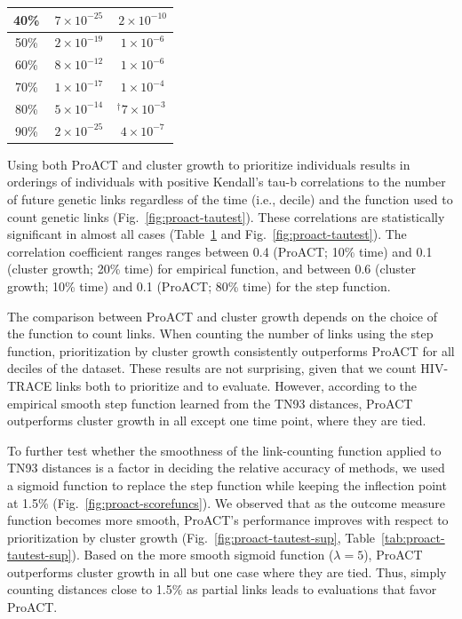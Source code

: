 \begin{table}[!ht]
\begin{center}
\begin{tabular}{|c|c|c|}
\hline
40\% & $^{\ }7\times10^{-25}$ & $^{\ }2\times10^{-10}$\\
\hline
50\% & $^{\ }2\times10^{-19}$ & $^{\ }1\times10^{-6}$\\
\hline
60\% & $^{\ }8\times10^{-12}$ & $^{\ }1\times10^{-6}$\\
\hline
70\% & $^{\ }1\times10^{-17}$ & $^{\ }1\times10^{-4}$\\
\hline
80\% & $^{\ }5\times10^{-14}$ & $^\dag7\times10^{-3}$\\
\hline
90\% & $^{\ }2\times10^{-25}$ & $^{\ }4\times10^{-7}$\\
\hline
\end{tabular}
\end{center}
\label{tab:proact-tautest}
\end{table}

Using both ProACT and cluster growth to prioritize individuals results in orderings of individuals with positive Kendall's tau-b correlations to the number of future genetic links  regardless of the time (i.e., decile) and the function used to count genetic links (Fig.~\ref{fig:proact-tautest}). These correlations are statistically significant in almost all cases  (Table~\ref{tab:proact-tautest} and Fig.~\ref{fig:proact-tautest}). The correlation coefficient ranges ranges between 0.4 (ProACT; 10\% time) and 0.1 (cluster growth; 20\% time) for empirical function, and between 0.6 (cluster growth; 10\% time) and 0.1 (ProACT; 80\% time) for the step function.

The comparison between ProACT and cluster growth depends on the choice of the function to count links. When counting the number of links using the step function, prioritization by cluster growth consistently outperforms ProACT for all deciles of the dataset. These results are not surprising, given that we count HIV-TRACE links both to prioritize and to evaluate. However, according to the empirical smooth step function learned from the \gls{TN93} distances, ProACT outperforms cluster growth in all except one time point, where they are tied.

To further test whether the smoothness of the link-counting function applied to \gls{TN93} distances is a factor in deciding the relative accuracy of methods, we used a sigmoid function to replace the step function while keeping the inflection point at 1.5\% (Fig.~\ref{fig:proact-scorefuncs}). We observed that as the outcome measure function becomes more smooth, ProACT's performance improves with respect to prioritization by cluster growth (Fig.~\ref{fig:proact-tautest-sup}, Table~\ref{tab:proact-tautest-sup}). Based on the more smooth sigmoid function ($\lambda=5$), ProACT outperforms cluster growth in all but one case where they are tied. Thus, simply counting distances close to 1.5\% as partial links leads to evaluations that favor ProACT.

